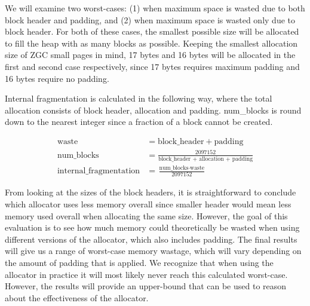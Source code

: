 We will examine two worst-cases: (1) when maximum space is wasted due to both block header and padding, and (2) when maximum space is wasted only due to block header. For both of these cases, the smallest possible size will be allocated to fill the heap with as many blocks as possible. Keeping the smallest allocation size of ZGC small pages in mind, 17 bytes and 16 bytes will be allocated in the first and second case respectively, since 17 bytes requires maximum padding and 16 bytes require no padding.

Internal fragmentation is calculated in the following way, where the total allocation consists of block header, allocation and padding. num\_blocks is round down to the nearest integer since a fraction of a block cannot be created.

\begin{align}
    \text{waste} &= \text{block\_header} + \text{padding} \\
    \text{num\_blocks} &= \frac{2097152}{\text{block\_header + allocation + padding}} \\
    \text{internal\_fragmentation} &= \frac{\text{num\_blocks} \cdot \text{waste}}{2097152}
\end{align}

From looking at the sizes of the block headers, it is straightforward to conclude which allocator uses less memory overall since smaller header would mean less memory used overall when allocating the same size. However, the goal of this evaluation is to see how much memory could theoretically be wasted when using different versions of the allocator, which also includes padding. The final results will give us a range of worst-case memory wastage, which will vary depending on the amount of padding that is applied. We recognize that when using the allocator in practice it will most likely never reach this calculated worst-case. However, the results will provide an upper-bound that can be used to reason about the effectiveness of the allocator.


